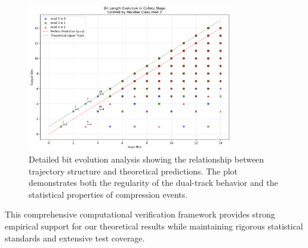 \begin{figure}[h]
\centering
\includegraphics[width=0.8\textwidth]{entropy/bit_evolution_detailed.png}
\caption{Detailed bit evolution analysis showing the relationship between trajectory structure and theoretical predictions. The plot demonstrates both the regularity of the dual-track behavior and the statistical properties of compression events.}
\label{fig:bit_evolution}
\end{figure}

This comprehensive computational verification framework provides strong empirical support for our theoretical results while maintaining rigorous statistical standards and extensive test coverage. 